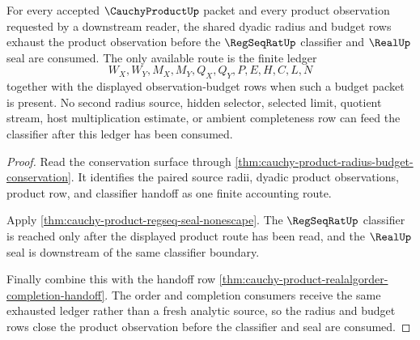 \begin{theorem}
\label{thm:cauchy-product-shared-budget-radius-exhaustion}
For every accepted $\CauchyProductUp$ packet and every product observation requested by a downstream reader, the shared dyadic radius and budget rows exhaust the product observation before the $\RegSeqRatUp$ classifier and $\RealUp$ seal are consumed. The only available route is the finite ledger
$$
W_X,W_Y,M_X,M_Y,Q_X,Q_Y,P,E,H,C,L,N
$$
together with the displayed observation-budget rows when such a budget packet is present. No second radius source, hidden selector, selected limit, quotient stream, host multiplication estimate, or ambient completeness row can feed the classifier after this ledger has been consumed.
\end{theorem}
\begin{proof}
Read the conservation surface through \autoref{thm:cauchy-product-radius-budget-conservation}. It identifies the paired source radii, dyadic product observations, product row, and classifier handoff as one finite accounting route.

Apply \autoref{thm:cauchy-product-regseq-seal-nonescape}. The $\RegSeqRatUp$ classifier is reached only after the displayed product route has been read, and the $\RealUp$ seal is downstream of the same classifier boundary.

Finally combine this with the handoff row \autoref{thm:cauchy-product-realalgorder-completion-handoff}. The order and completion consumers receive the same exhausted ledger rather than a fresh analytic source, so the radius and budget rows close the product observation before the classifier and seal are consumed.
\end{proof}

